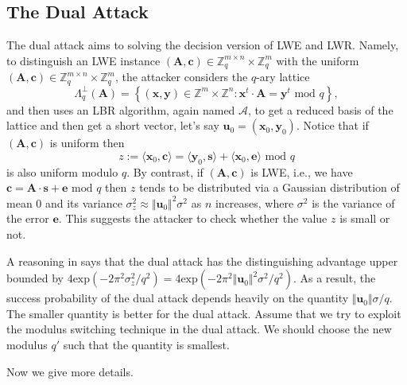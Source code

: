 \documentclass{cta-author}
\begin{document}
\subsection{The Dual Attack}\label{dualattack}
The dual attack aims to solving the decision version of LWE and LWR.  Namely, to distinguish an LWE instance   $(\mathbf{A}, \mathbf{c}) \in \mathbb{Z}_q^{m \times n} \times \mathbb{Z}_q^m$ with the uniform $(\mathbf{A}, \mathbf{c}) \in \mathbb{Z}_q^{m \times n} \times \mathbb{Z}_q^m$, the attacker considers the $q$-ary lattice
\begin{equation*}\label{dualla}
\Lambda_q^{\bot}{(\mathbf{A})}=\left\{ (\mathbf{x}, \mathbf{y}) \in \mathbb{Z}^m \times \mathbb{Z}^n:\mathbf{x}^t\cdot \mathbf{A}=\mathbf{y}^t \text{ mod } q \right\},
\end{equation*}
and then uses an LBR algorithm,  again named $\mathcal{A}$,  to get a reduced basis of the lattice and then get a short vector, let's say $\mathbf{u}_0=(\mathbf{x}_0, \mathbf{y}_0)$. Notice that if $(\mathbf{A}, \mathbf{c})$ is uniform then 
\begin{equation*}\label{keypp}
z:=\langle \mathbf{x}_0, \mathbf{c}\rangle=\langle \mathbf{y}_0, \mathbf{s}\rangle+\langle \mathbf{x}_0, \mathbf{e}\rangle \text{ mod } q
\end{equation*}
is also uniform modulo $q$. By contrast, if $(\mathbf{A}, \mathbf{c})$ is LWE, i.e., we have $ \mathbf{c}= \mathbf{A}\cdot \mathbf{s}+ \mathbf{e} \text{ mod } q$ then $z$ tends to be distributed via a Gaussian distribution of mean $0$ and its variance $\sigma_z^2\approx \Vert \mathbf{u}_0\Vert^2\sigma^2$ as $n$ increases, where $\sigma^2$ is the variance of the error $\mathbf{e}$. This suggests the attacker to check whether the value $z$ is small or not. 

A reasoning in \cite[Section 6.4]{ADP+11} says that the dual attack has the distinguishing advantage upper bounded by $4 \text{exp}(-2\pi^2\sigma_z^2/q^2)=4 \text{exp}(-2\pi^2\Vert \mathbf{u}_{0}\Vert^2\sigma^2/q^2)$. As a result, the success probability of the dual attack depends heavily on the quantity $\Vert \mathbf{u}_0\Vert\sigma/q$. The smaller quantity is better for the dual attack. Assume that we try to exploit the modulus switching technique in the dual attack. We should choose the new modulus $q'$ such that the quantity is smallest. 

Now we give more details.
\end{document}
